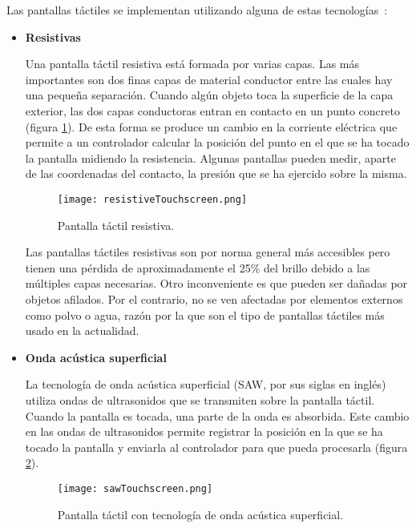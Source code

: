 Las pantallas táctiles se implementan utilizando alguna de estas
tecnologías~\cite{bib:touchscreen}:

\begin{itemize}
\item \textbf{Resistivas}

Una pantalla táctil resistiva está formada por varias capas. Las más 
importantes son dos finas capas de material conductor entre las cuales hay una 
pequeña separación. Cuando algún objeto toca la superficie de la capa exterior, 
las dos capas conductoras entran en contacto en un punto concreto
(figura \ref{fig:resistiveTouchscreen}). De esta forma se produce un cambio en 
la corriente eléctrica que permite a un controlador calcular la posición del 
punto en el que se ha tocado la pantalla midiendo la resistencia. Algunas 
pantallas pueden medir, aparte de las coordenadas del contacto, la presión que 
se ha ejercido sobre la misma.

  \begin{figure}[H]
    \begin{center}
      \texttt{[image: resistiveTouchscreen.png]}
      \caption{Pantalla táctil resistiva.}
      \label{fig:resistiveTouchscreen}
    \end{center}
  \end{figure}

Las pantallas táctiles resistivas son por norma general más accesibles pero 
tienen una pérdida de aproximadamente el 25\% del brillo debido a las múltiples 
capas necesarias. Otro inconveniente es que pueden ser dañadas por 
objetos afilados. Por el contrario, no se ven afectadas por elementos externos 
como polvo o agua, razón por la que son el tipo de pantallas táctiles más usado 
en la actualidad.

\item \textbf{Onda acústica superficial}

La tecnología de onda acústica superficial (\acs{SAW}, por sus siglas en 
inglés) utiliza ondas de ultrasonidos que se transmiten sobre la pantalla 
táctil. Cuando la pantalla es tocada, una parte de la onda es absorbida. Este 
cambio en las ondas de ultrasonidos permite registrar la posición en la que se 
ha tocado la pantalla y enviarla al controlador para que pueda procesarla
(figura \ref{fig:sawTouchscreen}).

  \begin{figure}[H]
    \begin{center}
      \texttt{[image: sawTouchscreen.png]}
      \caption{Pantalla táctil con tecnología de onda acústica
      superficial.}
      \label{fig:sawTouchscreen}
    \end{center}
  \end{figure}


\end{itemize}
